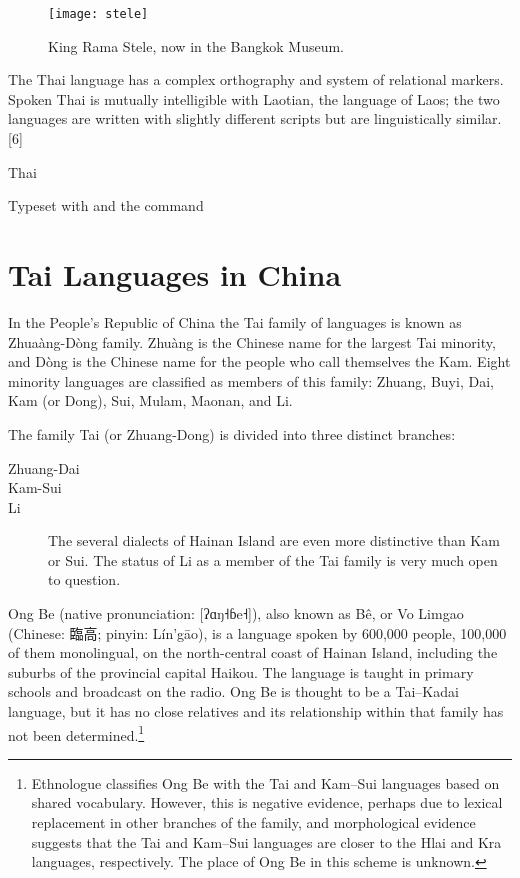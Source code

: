 \begin{figure}[htbp]
\parindent0pt
\centering
\texttt{[image: stele]}
\caption{King Rama Stele, now in the Bangkok Museum.}
\label{fig:stele}
\end{figure}


The Thai language has a complex orthography and system of relational markers. Spoken Thai is mutually intelligible with Laotian, the language of Laos; the two languages are written with slightly different scripts but are linguistically similar.[6]


\begin{scriptexample}[]{Thai}
\bgroup
\centerline{\LARGE{}}


\hfill Typeset with  and the command 
\egroup
\end{scriptexample}


\section{Tai Languages in China}

In the People's Republic of China the Tai family of languages is known as Zhua\`ang-D\`ong family. Zhu\`ang is the Chinese name for
the largest Tai minority, and D\`ong is the Chinese name for the people who call themselves the Kam. 
Eight minority languages are classified as members of this family: Zhuang, Buyi, Dai, Kam (or Dong), Sui, Mulam, Maonan, and Li.

The family Tai (or Zhuang-Dong) is divided into three distinct branches:

\begin{description}
\item [Zhuang-Dai]
\item [Kam-Sui]
\item[Li] The several dialects of Hainan Island are even more distinctive than Kam or Sui. The status of Li as a member of the Tai family is very much open to question.
\end{description}

Ong Be (native pronunciation: [ʔɑŋ˧ɓe˧]), also known as Bê, or Vo Limgao (Chinese: 臨高; pinyin: Lín'gāo), is a language spoken by 600,000 people, 100,000 of them monolingual, on the north-central coast of Hainan Island, including the suburbs of the provincial capital Haikou. The language is taught in primary schools and broadcast on the radio. Ong Be is thought to be a Tai–Kadai language, but it has no close relatives and its relationship within that family has not been determined.\footnote{Ethnologue classifies Ong Be with the Tai and Kam–Sui languages based on shared vocabulary. However, this is negative evidence, perhaps due to lexical replacement in other branches of the family, and morphological evidence suggests that the Tai and Kam–Sui languages are closer to the Hlai and Kra languages, respectively. The place of Ong Be in this scheme is unknown.}

